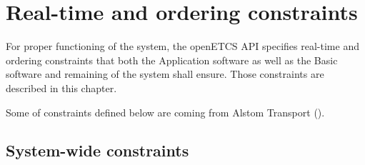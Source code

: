 \chapter{Real-time and ordering constraints}

For proper functioning of the system, the openETCS API specifies
real-time and ordering constraints that both the Application software
as well as the Basic software and remaining of the system shall
ensure. Those constraints are described in this chapter.

Some of constraints defined below are coming from Alstom Transport
(\cite{alstom-api}).

\section{System-wide constraints}

